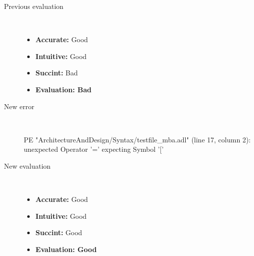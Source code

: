 \begin{description}
\begin{haskell}
\end{haskell}
  \item[Previous evaluation]~\\
    \begin{itemize}
    \item \textbf{Accurate:} Good
    \item \textbf{Intuitive:} Good
    \item \textbf{Succint:} Bad
    \item \textbf{Evaluation: Bad}
    \end{itemize}
  \item[New error]~\\
\begin{haskell}
PE "ArchitectureAndDesign/Syntax/testfile_mba.adl" (line 17, column 2):
unexpected Operator '='
expecting Symbol '['\end{haskell}
  \item[New evaluation]~\\
    \begin{itemize}
    \item \textbf{Accurate:} Good
    \item \textbf{Intuitive:} Good
    \item \textbf{Succint:} Good
    \item \textbf{Evaluation: Good
}
    \end{itemize}
  \end{description}

\hrulefill

